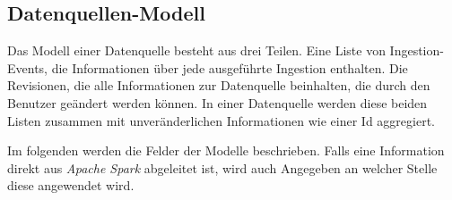\subsection{Datenquellen-Modell}

Das Modell einer Datenquelle besteht aus drei Teilen.
Eine Liste von Ingestion-Events, die Informationen über jede ausgeführte Ingestion enthalten.
Die Revisionen, die alle Informationen zur Datenquelle beinhalten, die durch den Benutzer geändert werden können.
In einer Datenquelle werden diese beiden Listen zusammen mit unveränderlichen Informationen wie einer Id aggregiert.

Im folgenden werden die Felder der Modelle beschrieben.
Falls eine Information direkt aus \textit{Apache Spark} abgeleitet ist, wird auch Angegeben an welcher Stelle diese angewendet wird.

